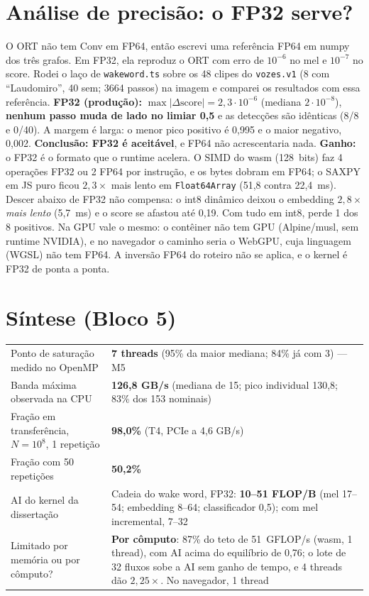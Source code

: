 \documentclass[10pt,a4paper]{article}
\begin{document}
\section{Análise de precisão: o FP32 serve?}
O ORT não tem Conv em FP64, então escrevi uma referência FP64 em numpy dos três grafos. Em FP32, ela reproduz o ORT com erro de $10^{-6}$ no mel e $10^{-7}$ no score.
Rodei o laço de \texttt{wakeword.ts} sobre os 48 clipes do \texttt{vozes.v1} (8 com ``Laudomiro'', 40 sem; 3664 passos) na imagem e comparei os resultados com essa referência.
\textbf{FP32 (produção):} $\max|\Delta\text{score}|=2{,}3\cdot10^{-6}$ (mediana $2\cdot10^{-8}$), \textbf{nenhum passo muda de lado no limiar 0,5} e as detecções são idênticas (8/8 e 0/40). A margem é larga: o menor pico positivo é 0,995 e o maior negativo, 0,002.
\textbf{Conclusão: FP32 é aceitável}, e FP64 não acrescentaria nada.
\textbf{Ganho:} o FP32 é o formato que o runtime acelera. O SIMD do wasm (128~bits) faz 4 operações FP32 ou 2 FP64 por instrução, e os bytes dobram em FP64; o SAXPY em JS puro ficou $2{,}3\times$ mais lento em \texttt{Float64Array} (51,8 contra 22,4~ms).
Descer abaixo de FP32 não compensa: o int8 dinâmico deixou o embedding $2{,}8\times$ \emph{mais lento} (5,7~ms) e o score se afastou até 0,19. Com tudo em int8, perde 1 dos 8 positivos.
Na GPU vale o mesmo: o contêiner não tem GPU (Alpine/musl, sem runtime NVIDIA), e no navegador o caminho seria o WebGPU, cuja linguagem (WGSL) não tem FP64. A inversão FP64 do roteiro não se aplica, e o kernel é FP32 de ponta a ponta.

\section{Síntese (Bloco 5)}
{\small\begin{tabular}{@{}P{6.0cm}P{11.6cm}@{}}
\toprule
Ponto de saturação medido no OpenMP & \textbf{7 threads} (95\% da maior mediana; 84\% já com 3) — M5 \\
Banda máxima observada na CPU & \textbf{126,8 GB/s} (mediana de 15; pico individual 130,8; 83\% dos 153 nominais) \\
Fração em transferência, $N=10^8$, 1 repetição & \textbf{98,0\%} (T4, PCIe a 4,6 GB/s) \\
Fração com 50 repetições & \textbf{50,2\%} \\
AI do kernel da dissertação & Cadeia do wake word, FP32: \textbf{10–51 FLOP/B} (mel 17–54; embedding 8–64; classificador 0,5); com mel incremental, 7–32 \\
Limitado por memória ou por cômputo? & \textbf{Por cômputo}: 87\% do teto de 51~GFLOP/s (wasm, 1 thread), com AI acima do equilíbrio de 0,76; o lote de 32 fluxos sobe a AI sem ganho de tempo, e 4 threads dão $2{,}25\times$. No navegador, 1 thread \\
\bottomrule
\end{tabular}}
\end{document}
